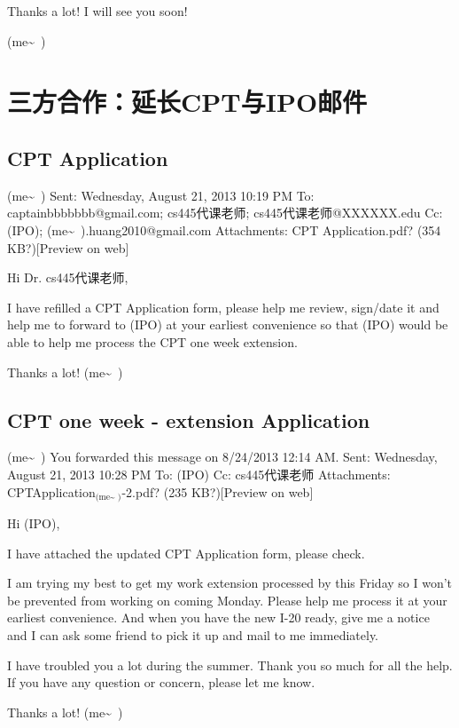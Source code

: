 \documentclass[12pt]{book}
\begin{document}
Thanks a lot! I will see you soon!

(me\textasciitilde{}~)

\chapter{三方合作：延长CPT与IPO邮件}
\label{sec-37}

\section{CPT Application}
\label{sec-37-1}
(me\textasciitilde{}~)
Sent:        Wednesday, August 21, 2013 10:19 PM
To:        
captainbbbbbbb@gmail.com; cs445代课老师; cs445代课老师@XXXXXX.edu
Cc:        
(IPO); (me\textasciitilde{}~).huang2010@gmail.com
Attachments:        
CPT Application.pdf? (354 KB?)[Preview on web]

Hi Dr. cs445代课老师, 

I have refilled a CPT Application form, please help me review, sign/date it and help me to forward to (IPO) at your earliest convenience so that (IPO) would be able to help me process the CPT one week extension. 

Thanks a lot!
(me\textasciitilde{}~)


\section{CPT one week - extension Application}
\label{sec-37-2}
(me\textasciitilde{}~)
You forwarded this message on 8/24/2013 12:14 AM.
Sent:        Wednesday, August 21, 2013 10:28 PM
To:        
(IPO)
Cc:        
cs445代课老师
Attachments:        
CPTApplication$_{\text{(me\textasciitilde{}~)}}$-2.pdf? (235 KB?)[Preview on web]

Hi (IPO), 

I have attached the updated CPT Application form, please check. 

I am trying my best to get my work extension processed by this Friday so I won't be prevented from working on coming Monday. Please help me process it at your earliest convenience. And when you have the new I-20 ready, give me a notice and I can ask some friend to pick it up and mail to me immediately. 

I have troubled you a lot during the summer. Thank you so much for all the help. If you have any question or concern, please let me know. 

Thanks a lot!
(me\textasciitilde{}~)
\end{document}

